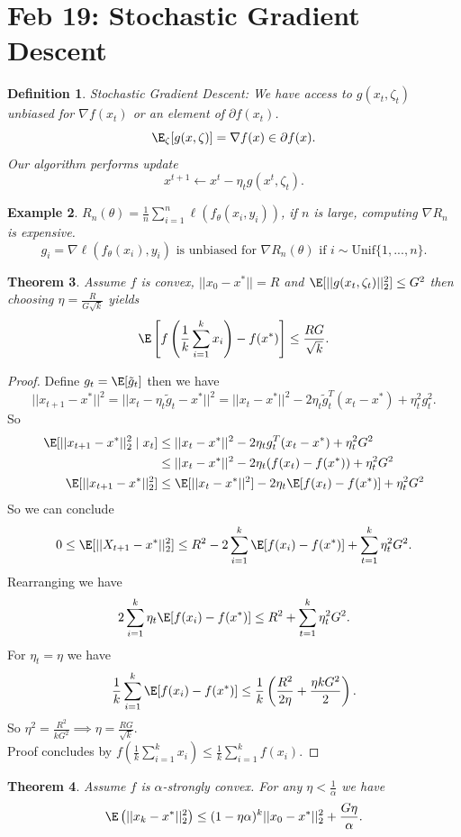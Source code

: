 \documentclass[a4paper]{article}
\newtheorem{thm}{Theorem}[section]
\newtheorem{defn}[thm]{Definition}
\newtheorem{eg}[thm]{Example}
\begin{document}
\section{Feb 19: Stochastic Gradient Descent}
\begin{defn}
    Stochastic Gradient Descent: We have access to $g(x_t,\zeta_t)$ unbiased for $\nabla f(x_t)$ or an element of $\partial f(x_t)$. 
    \[
    \E_\zeta[g(x,\zeta)]=\nabla f(x) \in \partial f(x)
    .\] 
    Our algorithm performs update \[
    x^{t+1}\leftarrow x^t-\eta_t g(x^t,\zeta_t)
    .\] 
\end{defn}
\begin{eg}
    $R_n(\theta)=\frac{1}{n}\sum_{i=1}^n \ell(f_\theta(x_i,y_i))$, if $n$ is large, computing $\nabla R_n$ is expensive. \[
        g_i=\nabla \ell (f_\theta(x_i),y_i) \text{ is unbiased for } \nabla R_n(\theta) \text{ if } i \sim \text{Unif} \{1,...,n\}
    .\]  
\end{eg}
\begin{thm}
    Assume $f$ is convex, $||x_0-x^*||=R$ and $\E[||g(x_t,\zeta_t)||_2^2]\leq G^2$ then choosing $\eta=\frac{R}{G\sqrt{k}}$ yields \[
    \E\left [f\left (\frac{1}{k}\sum_{i=1}^k x_i\right )-f(x^*)\right ]\leq \frac{RG}{\sqrt{k}}
    .\] 
\end{thm}
\begin{proof}
    Define $g_t=\E[\tilde{g}_t]$ then we have \[
    ||x_{t+1}-x^*||^2=||x_t-\eta_t \tilde{g}_t-x^* ||^2=||x_t-x^*||^2-2\eta_t \tilde{g}_t^T(x_t-x^*)+\eta_t^2 g_t^2
    .\] 
    So 
    \begin{align*}
        \E[||x_{t+1}-x^*||_2^2 \mid  x_t]&\leq ||x_t-x^*||^2-2\eta_tg_t^T(x_t-x^*)+\eta_t^2G^2\\
        &\leq ||x_t-x^*||^2-2\eta_t(f(x_t)-f(x^*))+\eta_t^2G^2\\
        \E[||x_{t+1}-x^*||_2^2]&\leq \E[||x_t-x^*||^2]-2\eta_t\E[f(x_t)-f(x^*)]+\eta_t^2G^2\\
    \end{align*}
    So we can conclude \[
    0\leq \E[||X_{t+1}-x^*||_2^2]\leq R^2-2\sum_{i=1}^k \E[f(x_i)-f(x^*)]+\sum_{t=1}^k\eta_t^2G^2
    .\] 
    Rearranging we have \[
    2\sum_{i=1}^k \eta_t \E[f(x_i)-f(x^*)]\leq R^2+\sum_{t=1}^k\eta_t^2G^2
    .\] 
    For $\eta_t=\eta$ we have \[
    \frac{1}{k}\sum_{i=1}^k \E[f(x_i)-f(x^*)]\leq \frac{1}{k}\left (\frac{R^2}{2\eta}+\frac{\eta kG^2}{2}\right )
    .\] 
    So $\eta^2=\frac{R^2}{kG^2}\implies \eta=\frac{RG}{\sqrt{k}}$. \\
    Proof concludes by $f \left( \frac{1}{k}\sum_{i=1}^k x_i\right )\leq \frac{1}{k}\sum_{i=1}^k f(x_i)$.
\end{proof}
\begin{thm}
    Assume $f$ is $\alpha$-strongly convex. For any $\eta<\frac{1}{\alpha}$ we have \[
    \E \left( ||x_k-x^*||_2^2 \right)\leq (1-\eta \alpha)^k ||x_0-x^*||_2^2+\frac{G\eta}{\alpha}
    .\] 
\end{thm}
\newpage
\end{document}
